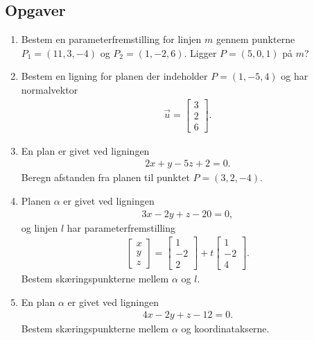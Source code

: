 \subsection{Opgaver}
\begin{enumerate}
	\item Bestem en parameterfremstilling for linjen $m$ gennem punkterne $P_1=(11,3,-4)$ og $P_2=(1,-2,6)$. Ligger $P=(5,0,1)$ på $m$?
	
	\item Bestem en ligning for planen der indeholder $P=(1,-5,4)$ og har normalvektor
	\begin{align*}
	\vec{u}=\begin{bmatrix}
	3\\2\\6
	\end{bmatrix}.
	\end{align*}
	
	\item En plan er givet ved ligningen 
	\begin{align*}
	2x+y-5z+2=0.
	\end{align*}
	Beregn afstanden fra planen til punktet $P=(3,2,-4)$.
	
	\item Planen $\alpha$ er givet ved ligningen
	\begin{align*}
	3x-2y+z-20=0,
	\end{align*}
	og linjen $l$ har parameterfremstilling
	\begin{align*}
		\begin{bmatrix}
		x\\y\\z
		\end{bmatrix}=\begin{bmatrix}
		1\\-2\\2
		\end{bmatrix}
		+t\begin{bmatrix}
		1\\-2\\4
		\end{bmatrix}.
	\end{align*}
	Bestem skæringspunkterne mellem $\alpha$ og $l$.
	
	\item En plan $\alpha$ er givet ved ligningen
	\begin{align*}
	4x-2y+z-12=0.
	\end{align*}
	Bestem skæringspunkterne mellem $\alpha$ og koordinatakserne.
	

\end{enumerate}
